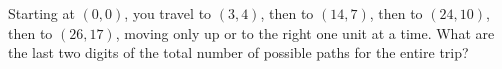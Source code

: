 Starting at $(0,0)$, you travel to $(3,4)$, then to $(14,7)$, then to $(24,10)$, then to $(26,17)$, moving only up or to the right one unit at a time. What are the last two digits of the total number of possible paths for the entire trip?
